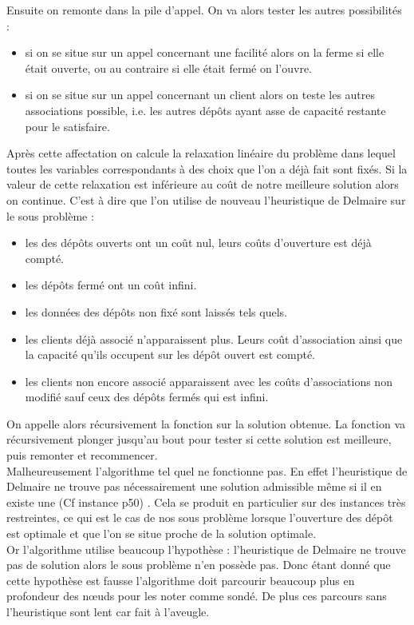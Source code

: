 \documentclass[12pt,a4paper]{article}
\begin{document}
Ensuite on remonte dans la pile d’appel. On va alors tester les autres possibilités :
\begin{itemize}
\item
si on se situe sur un appel concernant une facilité alors on la ferme si elle était ouverte, ou au contraire si elle était fermé on l'ouvre.
\item
si on se situe sur un appel concernant un client alors on teste les autres associations possible, i.e. les autres dépôts ayant asse de capacité restante pour le satisfaire.
\end{itemize}
Après cette affectation on calcule la relaxation linéaire du problème dans lequel toutes les variables correspondants à des choix que l'on a déjà fait sont fixés. Si la valeur de cette relaxation est inférieure au coût de notre meilleure solution alors on continue. C'est à dire que l'on utilise de nouveau l'heuristique de Delmaire sur le sous problème :
\begin{itemize}
\item
les des dépôts ouverts ont un coût nul, leurs coûts d'ouverture est déjà compté.
\item
les dépôts fermé ont un coût infini.
\item
les données des dépôts non fixé sont laissés tels quels.
\item
les clients déjà associé n’apparaissent plus. Leurs coût d'association ainsi que la capacité qu'ils occupent sur les dépôt ouvert est compté.
\item
les clients non encore associé apparaissent avec les coûts d'associations non modifié sauf ceux des dépôts fermés qui est infini.
\end{itemize}
On appelle alors récursivement la fonction sur la solution obtenue. La fonction va récursivement plonger jusqu'au bout pour tester si cette solution est meilleure, puis remonter et recommencer.\\

Malheureusement l'algorithme tel quel ne fonctionne pas. En effet l'heuristique de Delmaire ne trouve pas nécessairement une solution admissible même si il en existe une (Cf instance p50) . Cela se produit en particulier sur des instances très restreintes, ce qui est le cas de nos sous problème lorsque l'ouverture des dépôt est optimale et que l'on se situe proche de la solution optimale.\\
Or l'algorithme utilise beaucoup l'hypothèse : l'heuristique de Delmaire ne trouve pas de solution alors le sous problème n'en possède pas. Donc étant donné que cette hypothèse est fausse l'algorithme doit parcourir beaucoup plus en profondeur des nœuds pour les noter comme sondé. De plus ces parcours sans l’heuristique sont lent car fait à l'aveugle.\\
\end{document}
